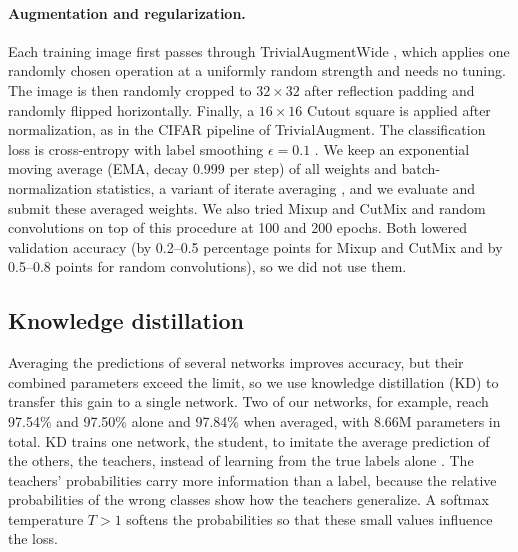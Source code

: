 \documentclass[letterpaper]{article}
\begin{document}
\paragraph{Augmentation and regularization.} Each training image first passes through TrivialAugmentWide
\cite{muller2021trivialaugment}, which applies one randomly chosen operation at a uniformly random strength and needs no
tuning. The image is then randomly cropped to $32{\times}32$ after reflection padding and randomly flipped horizontally.
Finally, a $16{\times}16$ Cutout square \cite{devries2017improved} is applied after normalization, as in the CIFAR pipeline of
TrivialAugment. The classification loss is cross-entropy with label smoothing $\epsilon=0.1$ \cite{szegedy2016rethinking}. We
keep an exponential moving average (EMA, decay 0.999 per step) of all weights and batch-normalization statistics, a variant of
iterate averaging \cite{polyak1992acceleration}, and we evaluate and submit these averaged weights. We also tried Mixup and CutMix \cite{zhang2018mixup,yun2019cutmix} and random
convolutions \cite{xu2021randconv} on top of this procedure at 100 and 200 epochs. Both lowered validation accuracy (by
0.2--0.5 percentage points for Mixup and CutMix and by 0.5--0.8 points for random convolutions), so we did not use
them.

\subsection{Knowledge distillation}
\label{sec:kd}
Averaging the predictions of several networks improves accuracy, but their combined parameters exceed the limit, so we use
knowledge distillation (KD) to transfer this gain to a single network. Two of our networks, for example, reach 97.54\% and
97.50\% alone and 97.84\% when averaged, with 8.66M parameters in total. KD trains one network, the student, to imitate the
average prediction of the others, the teachers, instead of learning from the true labels alone \cite{hinton2015distilling}. The
teachers' probabilities carry more information than a label, because the relative probabilities of the wrong classes show how the
teachers generalize. A softmax temperature $T>1$ softens the probabilities so that these small values influence the loss.
\end{document}
